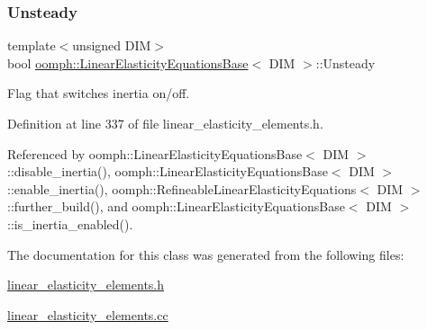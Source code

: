 \subsubsection{\texorpdfstring{Unsteady}{Unsteady}}
{\footnotesize\ttfamily template$<$unsigned D\+IM$>$ \\
bool \hyperlink{classoomph_1_1LinearElasticityEquationsBase}{oomph\+::\+Linear\+Elasticity\+Equations\+Base}$<$ D\+IM $>$\+::Unsteady\hspace{0.3cm}{\ttfamily [protected]}}



Flag that switches inertia on/off. 



Definition at line 337 of file linear\+\_\+elasticity\+\_\+elements.\+h.



Referenced by oomph\+::\+Linear\+Elasticity\+Equations\+Base$<$ D\+I\+M $>$\+::disable\+\_\+inertia(), oomph\+::\+Linear\+Elasticity\+Equations\+Base$<$ D\+I\+M $>$\+::enable\+\_\+inertia(), oomph\+::\+Refineable\+Linear\+Elasticity\+Equations$<$ D\+I\+M $>$\+::further\+\_\+build(), and oomph\+::\+Linear\+Elasticity\+Equations\+Base$<$ D\+I\+M $>$\+::is\+\_\+inertia\+\_\+enabled().



The documentation for this class was generated from the following files\+:\begin{DoxyCompactItemize}
\item 
\hyperlink{linear__elasticity__elements_8h}{linear\+\_\+elasticity\+\_\+elements.\+h}\item 
\hyperlink{linear__elasticity__elements_8cc}{linear\+\_\+elasticity\+\_\+elements.\+cc}\end{DoxyCompactItemize}

